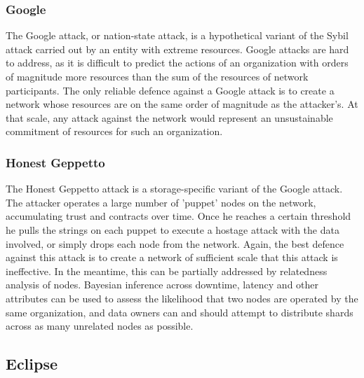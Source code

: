 \documentclass[a4paper,10pt]{article} \usepackage[utf8]{inputenc}
\begin{document}
\subsubsection{Google}

The Google attack, or nation-state attack, is a hypothetical variant of the
Sybil attack carried out by an entity with extreme resources. Google attacks are
hard to address, as it is difficult to predict the actions of an organization
with orders of magnitude more resources than the sum of the resources of network
participants. The only reliable defence against a Google attack is to create a
network whose resources are on the same order of magnitude as the attacker's. At
that scale, any attack against the network would represent an unsustainable
commitment of resources for such an organization.

\subsubsection{Honest Geppetto}

The Honest Geppetto attack is a storage-specific variant of the Google attack.
The attacker operates a large number of 'puppet' nodes on the network,
accumulating trust and contracts over time. Once he reaches a certain threshold
he pulls the strings on each puppet to execute a hostage attack with the data
involved, or simply drops each node from the network. Again, the best defence
against this attack is to create a network of sufficient scale that this attack
is ineffective. In the meantime, this can be partially addressed by relatedness
analysis of nodes. Bayesian inference across downtime, latency and other
attributes can be used to assess the likelihood that two nodes are operated by
the same organization, and data owners can and should attempt to distribute
shards across as many unrelated nodes as possible.

\subsection{Eclipse}
\end{document}
